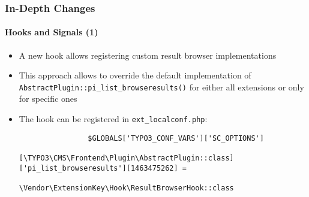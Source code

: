 \begin{frame}[fragile]
	\frametitle{In-Depth Changes}
	\framesubtitle{Hooks and Signals (1)}

	\lstset{basicstyle=\tiny\ttfamily}

	\begin{itemize}

		\item A new hook allows registering custom result browser implementations

		\item This approach allows to override the default implementation of
			\texttt{AbstractPlugin::pi\_list\_browseresults()}
			for either all extensions or only for specific ones

		\item The hook can be registered in \texttt{ext\_localconf.php}:

			\begin{lstlisting}
				$GLOBALS['TYPO3_CONF_VARS']['SC_OPTIONS']
				  [\TYPO3\CMS\Frontend\Plugin\AbstractPlugin::class]['pi_list_browseresults'][1463475262] =
				  \Vendor\ExtensionKey\Hook\ResultBrowserHook::class
			\end{lstlisting}

	\end{itemize}

\end{frame}


